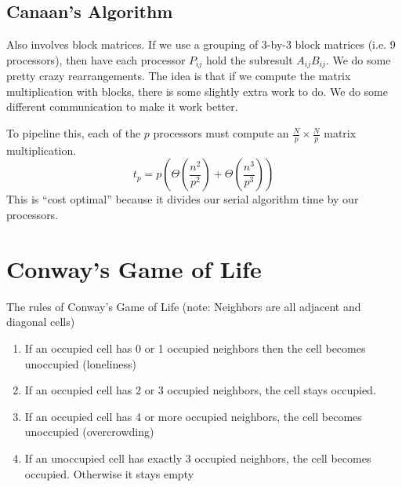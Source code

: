 \documentclass[12pt]{article}
\numberwithin{equation}{section}
\theoremstyle{theorem}
\theoremstyle{definition}
\theoremstyle{remark}
\begin{document}
\subsection{Canaan's Algorithm}
Also involves block matrices. If we use a grouping of 3-by-3 block matrices (i.e. 9 processors), then have each processor $P_{ij}$ hold the subresult $A_{ij}B_{ij}$.  We do some pretty crazy rearrangements.  The idea is that if we compute the matrix multiplication with blocks, there is some slightly extra work to do.  We do some different communication to make it work better. 

To pipeline this, each of the $p$ processors must compute an $\frac{N}{p} \times \frac{N}{p}$ matrix multiplication.  
\begin{equation*}
t_p = p(\Theta(\frac{n^2}{p^2}) + \Theta(\frac{n^3}{p^3}))
\end{equation*}
This is ``cost optimal'' because it divides our serial algorithm time by our processors.

\section{Conway's Game of Life}
The rules of Conway's Game of Life (note: Neighbors are all adjacent and diagonal cells)
\begin{enumerate}
\item If an occupied cell has 0 or 1 occupied neighbors then the cell becomes unoccupied (loneliness)
\item If an occupied cell has 2 or 3 occupied neighbors, the cell stays occupied. 
\item If an occupied cell has 4 or more occupied neighbors, the cell becomes unoccupied (overcrowding)
\item If an unoccupied cell has exactly 3 occupied neighbors, the cell becomes occupied.  Otherwise it stays empty
\end{enumerate}
\end{document}
